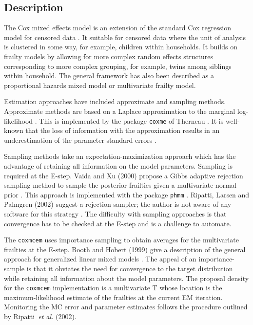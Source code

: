 \subsection{Description}

The Cox mixed effects model is an extension of the standard Cox
regression model for censored data \cite{Cox1972a,Cox1975a}. It
suitable for censored data where the unit of analysis is clustered in
some way, for example, children within households. It builds on
frailty models by allowing for more complex random effects structures
corresponding to more complex grouping, for example, twins among
siblings within household. The general framework has also been
described as a proportional hazards mixed model or multivariate
frailty model. 

Estimation approaches have included approximate and sampling
methods. Approximate methods are based on a Laplace approximation to
the marginal log-likelihood \cite{Ripatti2000a}. This is implemented
by the package \texttt{coxme} of Therneau \cite{Therneau2009a}. It is well-known that the
loss of information with the approximation results in an
underestimation of the parameter standard errors \cite{Abrahantes2007a}.

Sampling methods take an expectation-maximization approach which has
the advantage of retaining all information on the model
parameters. Sampling is required at the E-step. Vaida and Xu (2000) propose
a Gibbs adaptive rejection sampling method to sample the posterior
frailties given a multivariate-normal prior \cite{Vaida2000a}. This
approach is implemented with the package \texttt{phmm}
\cite{Donohue2010a}. Ripatti, Larsen and Palmgren (2002) suggest a rejection sampler; the author is not
aware of any software for this strategy \cite{Ripatti2002a}. The difficulty
with sampling approaches is that convergence has to be checked at the
E-step and is a challenge to automate. 

The \texttt{coxmcem} uses importance sampling to obtain averages for
the multivariate frailties at the E-step. Booth and Hobert (1999) give a description of
the general approach for generalized linear mixed models
\cite{Booth1999a}. The appeal of an importance-sample is that it obviates the need for
convergence to the target distribution while retaining all information
about the model parameters. The proposal density for the
\texttt{coxmcem} implementation is a
multivariate T whose location is the maximum-likelihood estimate of
the frailties at the current EM iteration. Monitoring the MC error and
parameter estimates follows the procedure outlined by Ripatti~\emph{et
  al.} (2002). 


